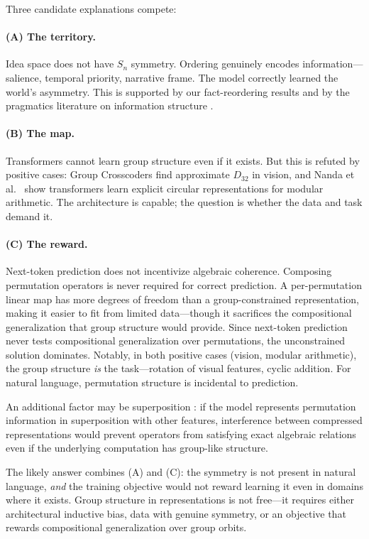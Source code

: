 \documentclass[10pt, letterpaper]{article}
\begin{document}
Three candidate explanations compete:

\paragraph{(A) The territory.} Idea space does not have $S_n$ symmetry. Ordering genuinely encodes information---salience, temporal priority, narrative frame. The model correctly learned the world's asymmetry. This is supported by our fact-reordering results and by the pragmatics literature on information structure \cite{krifka2008, lambrecht1994}.

\paragraph{(B) The map.} Transformers cannot learn group structure even if it exists. But this is refuted by positive cases: Group Crosscoders \cite{gorton2024group} find approximate $D_{32}$ in vision, and Nanda et al.\ \cite{nanda2023grokking} show transformers learn explicit circular representations for modular arithmetic. The architecture is capable; the question is whether the data and task demand it.

\paragraph{(C) The reward.} Next-token prediction does not incentivize algebraic coherence. Composing permutation operators is never required for correct prediction. A per-permutation linear map has more degrees of freedom than a group-constrained representation, making it easier to fit from limited data---though it sacrifices the compositional generalization that group structure would provide. Since next-token prediction never tests compositional generalization over permutations, the unconstrained solution dominates. Notably, in both positive cases (vision, modular arithmetic), the group structure \emph{is} the task---rotation of visual features, cyclic addition. For natural language, permutation structure is incidental to prediction.

An additional factor may be superposition \cite{elhage2022superposition}: if the model represents permutation information in superposition with other features, interference between compressed representations would prevent operators from satisfying exact algebraic relations even if the underlying computation has group-like structure.

The likely answer combines (A) and (C): the symmetry is not present in natural language, \emph{and} the training objective would not reward learning it even in domains where it exists. Group structure in representations is not free---it requires either architectural inductive bias, data with genuine symmetry, or an objective that rewards compositional generalization over group orbits.
\end{document}
